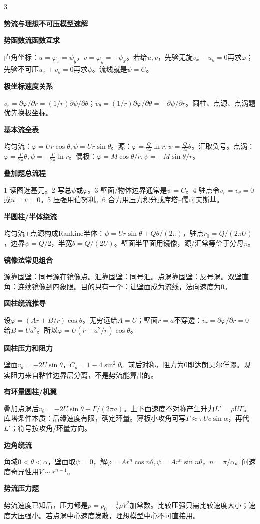 \documentclass[a4paper]{article}
\newcommand{\qt}[1]{\vspace{0.25pt}\colorbox{Q}{\parbox{\dimexpr\linewidth-2\fboxsep}{\color{white}\bfseries #1}}\par}
\newcommand{\sect}[1]{\qt{#1}}
\begin{document}
\begin{multicols}{3}
{\sect{势流与理想不可压模型速解}
\sect{势函数流函数互求}
直角坐标：$u=\varphi_x=\psi_y$，$v=\varphi_y=-\psi_x$。若给$u,v$，先验无旋$v_x-u_y=0$再求$\varphi$；先验不可压$u_x+v_y=0$再求$\psi$。流线就是$\psi=C$。
\sect{极坐标速度关系}
$v_r=\partial\varphi/\partial r=(1/r)\partial\psi/\partial\theta$；$v_\theta=(1/r)\partial\varphi/\partial\theta=-\partial\psi/\partial r$。圆柱、点源、点涡题优先换极坐标。
\sect{基本流全表}
均匀流：$\varphi=Ur\cos\theta,\psi=Ur\sin\theta$。源：$\varphi=\frac Q{2\pi}\ln r,\psi=\frac Q{2\pi}\theta$。汇取负号。点涡：$\varphi=\frac\Gamma{2\pi}\theta,\psi=-\frac\Gamma{2\pi}\ln r$。偶极：$\varphi=M\cos\theta/r,\psi=-M\sin\theta/r$。
\sect{叠加题总流程}
1 读图选基元。2 写总$\psi$或$\varphi$。3 壁面/物体边界通常是$\psi=C$。4 驻点令$v_r=v_\theta=0$或$u=v=0$。5 压强用伯努利。6 合力用压力积分或库塔--儒可夫斯基。
\sect{半圆柱/半体绕流}
均匀流+点源构成Rankine半体：$\psi=Ur\sin\theta+Q\theta/(2\pi)$，驻点$r_0=Q/(2\pi U)$，边界$\psi=Q/2$，半宽$b=Q/(2U)$。壁面半平面用镜像，源/汇常等价于分母$\pi$。
\sect{镜像法常见组合}
源靠固壁：同号源在镜像点。汇靠固壁：同号汇。点涡靠固壁：反号涡。双壁直角：连续镜像到四象限。目的只有一个：让壁面成为流线，法向速度为0。
\sect{圆柱绕流推导}
设$\varphi=(Ar+B/r)\cos\theta$。无穷远给$A=U$；壁面$r=a$不穿透：$v_r=\partial\varphi/\partial r=0$给$B=Ua^2$。所以$\varphi=U(r+a^2/r)\cos\theta$。
\sect{圆柱压力和阻力}
壁面$v_\theta=-2U\sin\theta$，$C_p=1-4\sin^2\theta$。前后对称，阻力为0即达朗贝尔佯谬。现实阻力来自粘性边界层分离，不是势流能算出的。
\sect{有环量圆柱/机翼}
叠加点涡后$v_\theta=-2U\sin\theta+\Gamma/(2\pi a)$。上下面速度不对称产生升力$L'=\rho U\Gamma$。库塔条件本质：后缘速度有限，确定环量。薄板小攻角可写$\Gamma\approx\pi Uc\sin\alpha$，再代$L'$；符号按攻角/环量方向。
\sect{边角绕流}
角域$0<\theta<\alpha$，壁面取$\psi=0$，解$\varphi=Ar^n\cos n\theta,\psi=Ar^n\sin n\theta$，$n=\pi/\alpha$。问速度奇异性用$V\sim r^{n-1}$。
\sect{势流压力题}
势流速度已知后，压力都是$p=p_0-\frac12\rho V^2$加常数。比较压强只需比较速度大小；速度大压强小。若点涡中心速度发散，理想模型中心不可直接用。

}
\end{multicols}
\end{document}
